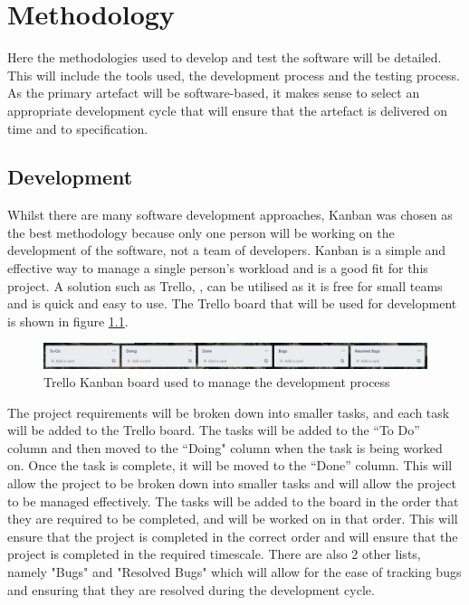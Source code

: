 \chapter{Methodology}
\label{chap:methodology}
Here the methodologies used to develop and test the software will be detailed. This will include the tools used, the development process and the testing process. As the primary artefact will be software-based, it makes sense to select an appropriate development cycle that will ensure that the artefact is delivered on time and to specification.
\section{Development}
\label{methodology:development}
Whilst there are many software development approaches, Kanban was chosen as the best methodology because only one person will be working on the development of the software, not a team of developers. Kanban is a simple and effective way to manage a single person’s workload and is a good fit for this project. A solution such as Trello, \cite{trello}, can be utilised as it is free for small teams and is quick and easy to use. The Trello board that will be used for development is shown in figure \ref{fig:kanban-board}.

\begin{figure}[H]
    \centering
    \includegraphics[scale=0.2]{images/trello-board.png}
    \caption{Trello Kanban board used to manage the development process}
    \label{fig:kanban-board}
\end{figure}

The project requirements will be broken down into smaller tasks, and each task will be added to the Trello board. The tasks will be added to the “To Do” column and then moved to the “Doing" column when the task is being worked on. Once the task is complete, it will be moved to the “Done” column. This will allow the project to be broken down into smaller tasks and will allow the project to be managed effectively. The tasks will be added to the board in the order that they are required to be completed, and will be worked on in that order. This will ensure that the project is completed in the correct order and will ensure that the project is completed in the required timescale.
There are also 2 other lists, namely "Bugs" and "Resolved Bugs" which will allow for the ease of tracking bugs and ensuring that they are resolved during the development cycle.

